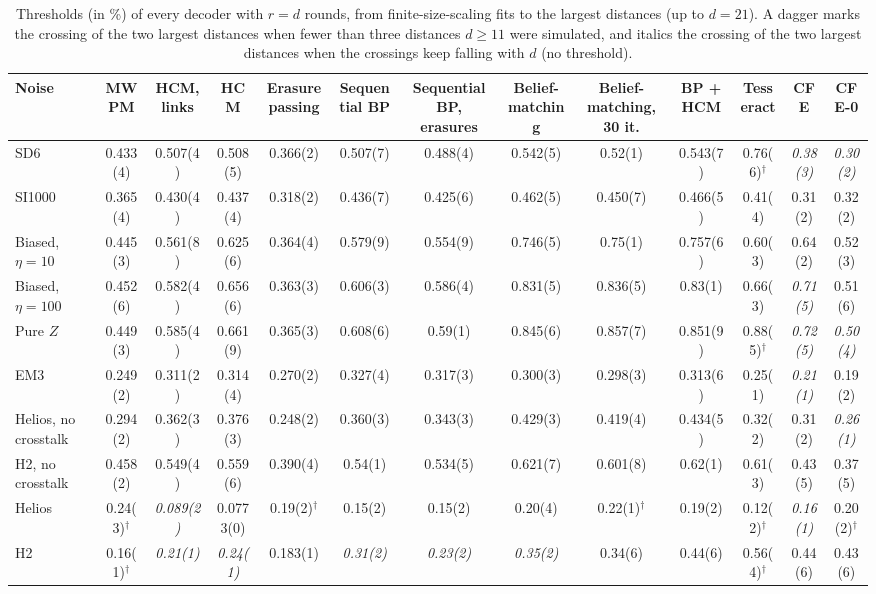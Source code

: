 \begin{table}[t]
  \begin{ruledtabular}
  \begin{tabular}{lcccccccccccc}
    Noise & MWPM & HCM, links & HCM & Erasure passing & Sequential BP & Sequential BP, erasures & Belief-matching & Belief-matching, 30 it. & BP + HCM & Tesseract & CFE & CFE-0 \\
    \hline
    SD6 & 0.433(4) & 0.507(4) & 0.508(5) & 0.366(2) & 0.507(7) & 0.488(4) & 0.542(5) & 0.52(1) & 0.543(7) & 0.76(6)$^\dagger$ & \textit{0.38(3)} & \textit{0.30(2)} \\
    SI1000 & 0.365(4) & 0.430(4) & 0.437(4) & 0.318(2) & 0.436(7) & 0.425(6) & 0.462(5) & 0.450(7) & 0.466(5) & 0.41(4) & 0.31(2) & 0.32(2) \\
    Biased, $\eta=10$ & 0.445(3) & 0.561(8) & 0.625(6) & 0.364(4) & 0.579(9) & 0.554(9) & 0.746(5) & 0.75(1) & 0.757(6) & 0.60(3) & 0.64(2) & 0.52(3) \\
    Biased, $\eta=100$ & 0.452(6) & 0.582(4) & 0.656(6) & 0.363(3) & 0.606(3) & 0.586(4) & 0.831(5) & 0.836(5) & 0.83(1) & 0.66(3) & \textit{0.71(5)} & 0.51(6) \\
    Pure $Z$ & 0.449(3) & 0.585(4) & 0.661(9) & 0.365(3) & 0.608(6) & 0.59(1) & 0.845(6) & 0.857(7) & 0.851(9) & 0.88(5)$^\dagger$ & \textit{0.72(5)} & \textit{0.50(4)} \\
    EM3 & 0.249(2) & 0.311(2) & 0.314(4) & 0.270(2) & 0.327(4) & 0.317(3) & 0.300(3) & 0.298(3) & 0.313(6) & 0.25(1) & \textit{0.21(1)} & 0.19(2) \\
    Helios, no crosstalk & 0.294(2) & 0.362(3) & 0.376(3) & 0.248(2) & 0.360(3) & 0.343(3) & 0.429(3) & 0.419(4) & 0.434(5) & 0.32(2) & 0.31(2) & \textit{0.26(1)} \\
    H2, no crosstalk & 0.458(2) & 0.549(4) & 0.559(6) & 0.390(4) & 0.54(1) & 0.534(5) & 0.621(7) & 0.601(8) & 0.62(1) & 0.61(3) & 0.43(5) & 0.37(5) \\
    Helios & 0.24(3)$^\dagger$ & \textit{0.089(2)} & 0.0773(0) & 0.19(2)$^\dagger$ & 0.15(2) & 0.15(2) & 0.20(4) & 0.22(1)$^\dagger$ & 0.19(2) & 0.12(2)$^\dagger$ & \textit{0.16(1)} & 0.20(2)$^\dagger$ \\
    H2 & 0.16(1)$^\dagger$ & \textit{0.21(1)} & \textit{0.24(1)} & 0.183(1) & \textit{0.31(2)} & \textit{0.23(2)} & \textit{0.35(2)} & 0.34(6) & 0.44(6) & 0.56(4)$^\dagger$ & 0.44(6) & 0.43(6) \\
  \end{tabular}
  \end{ruledtabular}
  \caption{Thresholds (in \%) of every decoder with $r=d$ rounds, from finite-size-scaling fits to the largest distances (up to $d=21$). A dagger marks the crossing of the two largest distances when fewer than three distances $d\ge 11$ were simulated, and italics the crossing of the two largest distances when the crossings keep falling with $d$ (no threshold).}
  \label{tab:campaign_rd}
\end{table}
